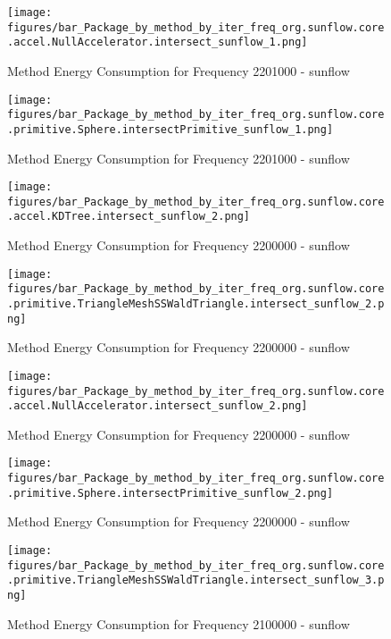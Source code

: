 				\begin{figure}[H]
				\centering
				\texttt{[image: figures/bar\_Package\_by\_method\_by\_iter\_freq\_org.sunflow.core.accel.NullAccelerator.intersect\_sunflow\_1.png]}
				\caption{Method Energy Consumption for Frequency 2201000 - sunflow}				
				\end{figure}				
				
				\begin{figure}[H]
				\centering
				\texttt{[image: figures/bar\_Package\_by\_method\_by\_iter\_freq\_org.sunflow.core.primitive.Sphere.intersectPrimitive\_sunflow\_1.png]}
				\caption{Method Energy Consumption for Frequency 2201000 - sunflow}				
				\end{figure}				
				
				\begin{figure}[H]
				\centering
				\texttt{[image: figures/bar\_Package\_by\_method\_by\_iter\_freq\_org.sunflow.core.accel.KDTree.intersect\_sunflow\_2.png]}
				\caption{Method Energy Consumption for Frequency 2200000 - sunflow}				
				\end{figure}				
				
				\begin{figure}[H]
				\centering
				\texttt{[image: figures/bar\_Package\_by\_method\_by\_iter\_freq\_org.sunflow.core.primitive.TriangleMeshSSWaldTriangle.intersect\_sunflow\_2.png]}
				\caption{Method Energy Consumption for Frequency 2200000 - sunflow}				
				\end{figure}				
				
				\begin{figure}[H]
				\centering
				\texttt{[image: figures/bar\_Package\_by\_method\_by\_iter\_freq\_org.sunflow.core.accel.NullAccelerator.intersect\_sunflow\_2.png]}
				\caption{Method Energy Consumption for Frequency 2200000 - sunflow}				
				\end{figure}				
				
				\begin{figure}[H]
				\centering
				\texttt{[image: figures/bar\_Package\_by\_method\_by\_iter\_freq\_org.sunflow.core.primitive.Sphere.intersectPrimitive\_sunflow\_2.png]}
				\caption{Method Energy Consumption for Frequency 2200000 - sunflow}				
				\end{figure}				
				
				\begin{figure}[H]
				\centering
				\texttt{[image: figures/bar\_Package\_by\_method\_by\_iter\_freq\_org.sunflow.core.primitive.TriangleMeshSSWaldTriangle.intersect\_sunflow\_3.png]}
				\caption{Method Energy Consumption for Frequency 2100000 - sunflow}				
				\end{figure}				
				
